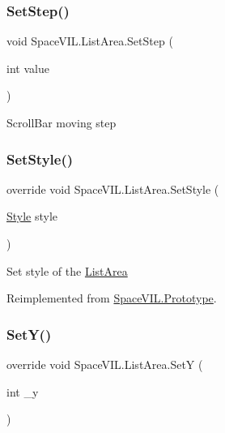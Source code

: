 \subsubsection{\texorpdfstring{Set\+Step()}{SetStep()}}
{\footnotesize\ttfamily void Space\+V\+I\+L.\+List\+Area.\+Set\+Step (\begin{DoxyParamCaption}\item[{int}]{value }\end{DoxyParamCaption})}



Scroll\+Bar moving step 

\mbox{\label{class_space_v_i_l_1_1_list_area_a04902026e7956980b7dce5bff22d082c}} 
\subsubsection{\texorpdfstring{Set\+Style()}{SetStyle()}}
{\footnotesize\ttfamily override void Space\+V\+I\+L.\+List\+Area.\+Set\+Style (\begin{DoxyParamCaption}\item[{\mbox{\hyperlink{class_space_v_i_l_1_1_decorations_1_1_style}{Style}}}]{style }\end{DoxyParamCaption})\hspace{0.3cm}{\ttfamily [virtual]}}



Set style of the \mbox{\hyperlink{class_space_v_i_l_1_1_list_area}{List\+Area}} 



Reimplemented from \mbox{\hyperlink{class_space_v_i_l_1_1_prototype_ae96644a6ace490afb376fb542161e541}{Space\+V\+I\+L.\+Prototype}}.

\mbox{\label{class_space_v_i_l_1_1_list_area_a0c0974eca2621188c88ba752a5f62a1a}} 
\subsubsection{\texorpdfstring{Set\+Y()}{SetY()}}
{\footnotesize\ttfamily override void Space\+V\+I\+L.\+List\+Area.\+SetY (\begin{DoxyParamCaption}\item[{int}]{\+\_\+y }\end{DoxyParamCaption})\hspace{0.3cm}{\ttfamily [virtual]}}



